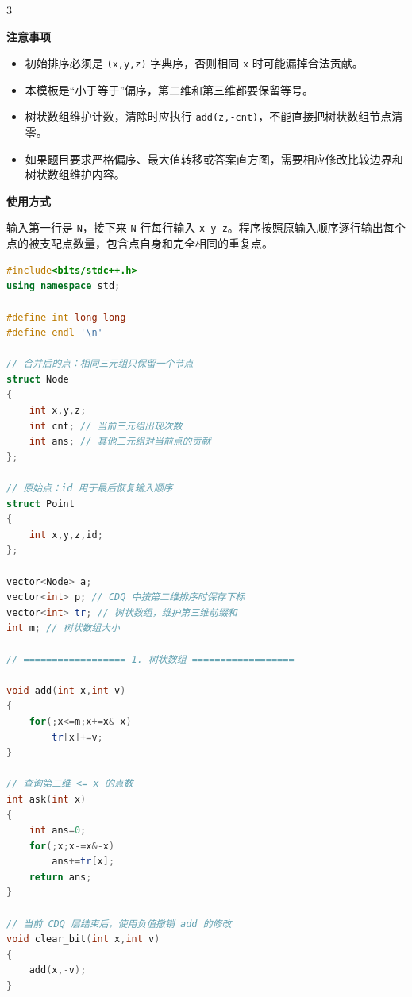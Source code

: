 \documentclass[10pt,landscape,a4paper]{article}
\begin{document}
\begin{multicols*}{3}
\begin{enumerate}[start=1]
\end{enumerate}
\par\addvspace{0.7ex}\noindent\textbf{注意事项}\par\nobreak
\begin{itemize}
\item 初始排序必须是 \texttt{(\allowbreak{}x\allowbreak{},\allowbreak{}y\allowbreak{},\allowbreak{}z\allowbreak{})} 字典序，否则相同 \texttt{x} 时可能漏掉合法贡献。
\item 本模板是“小于等于”偏序，第二维和第三维都要保留等号。
\item 树状数组维护计数，清除时应执行 \texttt{a\allowbreak{}d\allowbreak{}d\allowbreak{}(\allowbreak{}z\allowbreak{},\allowbreak{}-\allowbreak{}c\allowbreak{}n\allowbreak{}t\allowbreak{})}，不能直接把树状数组节点清零。
\item 如果题目要求严格偏序、最大值转移或答案直方图，需要相应修改比较边界和树状数组维护内容。
\end{itemize}
\par\addvspace{0.7ex}\noindent\textbf{使用方式}\par\nobreak
输入第一行是 \texttt{N}，接下来 \texttt{N} 行每行输入 \texttt{x\allowbreak{} \allowbreak{}y\allowbreak{} \allowbreak{}z}。程序按照原输入顺序逐行输出每个点的被支配点数量，包含点自身和完全相同的重复点。\par
\par{}\par
\begin{lstlisting}[language=C++]
#include<bits/stdc++.h>
using namespace std;

#define int long long
#define endl '\n'

// 合并后的点：相同三元组只保留一个节点
struct Node
{
    int x,y,z;
    int cnt; // 当前三元组出现次数
    int ans; // 其他三元组对当前点的贡献
};

// 原始点：id 用于最后恢复输入顺序
struct Point
{
    int x,y,z,id;
};

vector<Node> a;
vector<int> p; // CDQ 中按第二维排序时保存下标
vector<int> tr; // 树状数组，维护第三维前缀和
int m; // 树状数组大小

// ================== 1. 树状数组 ==================

void add(int x,int v)
{
    for(;x<=m;x+=x&-x)
        tr[x]+=v;
}

// 查询第三维 <= x 的点数
int ask(int x)
{
    int ans=0;
    for(;x;x-=x&-x)
        ans+=tr[x];
    return ans;
}

// 当前 CDQ 层结束后，使用负值撤销 add 的修改
void clear_bit(int x,int v)
{
    add(x,-v);
}


\end{lstlisting}
\end{multicols*}
\end{document}

